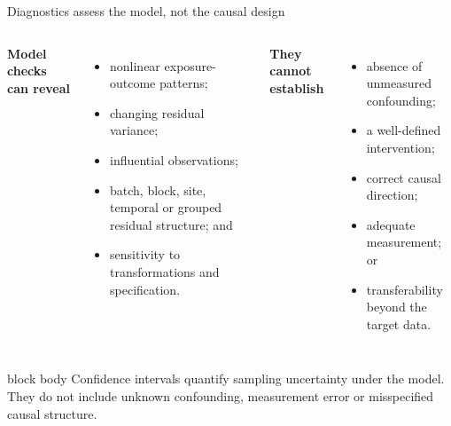 \documentclass[10pt,aspectratio=169]{beamer}
\begin{document}
\begin{frame}{Diagnostics assess the model, not the causal design}

\small

\begin{columns}[T]


\textbf{Model checks can reveal}

\begin{itemize}
  \item nonlinear exposure-outcome patterns;
  \item changing residual variance;
  \item influential observations;
  \item batch, block, site, temporal or grouped residual structure; and
  \item sensitivity to transformations and specification.
\end{itemize}


\textbf{They cannot establish}

\begin{itemize}
  \item absence of unmeasured confounding;
  \item a well-defined intervention;
  \item correct causal direction;
  \item adequate measurement; or
  \item transferability beyond the target data.
\end{itemize}

\end{columns}

\vspace{0.35cm}

\begin{beamercolorbox}[rounded=true,sep=8pt]{block body}
Confidence intervals quantify sampling uncertainty under the model. They do not include unknown confounding, measurement error or misspecified causal structure.
\end{beamercolorbox}

\end{frame}
\end{document}
